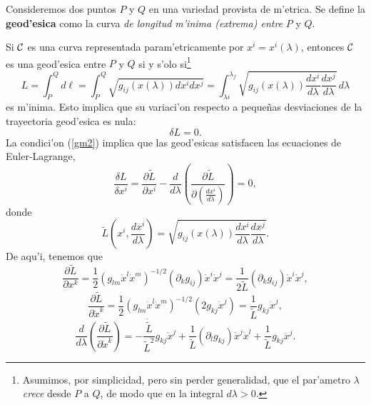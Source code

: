 Consideremos dos puntos $P$ y $Q$ en una variedad provista de m'etrica.
Se define la \textbf{geod'esica} como la curva \textit{de longitud m'inima  (extrema) entre} $P$ y $Q$.

Si $\cal C$ es una curva representada param'etricamente por
$x^i =x^i (\lambda)$, entonces $\cal C$ es una geod'esica entre $P$ y $Q$ si y
s'olo si\footnote{Asumimos, por simplicidad, pero sin perder generalidad, que el par'ametro $\lambda$ \textit{crece} desde $P$ a $Q$, de modo que en la integral $d\lambda>0$.}
\begin{equation}
L=\int_P^Qd\ell= \int_P^Q\sqrt{g_{ij}(x(\lambda))dx^idx^j}=\int_{\lambda i}^{\lambda_{f}}\sqrt{g_{ij}(x(\lambda))\frac{dx^i}{d\lambda}\frac{dx^j }{d\lambda}}\, d\lambda \label{gm1}
\end{equation}
es m'inima. Esto implica que su variaci'on respecto a peque\~nas desviaciones de la trayectoria geod'esica es nula:
\begin{equation}
\delta L=0. \label{gm2}
\end{equation}
La condici'on (\ref{gm2}) implica que las geod'esicas satisfacen las ecuaciones de Euler-Lagrange,
\begin{equation}
\frac{\delta L}{\delta x^i }=\frac{\partial \tilde{L}}{\partial x^i }-\frac
{d}{d\lambda}\left( \frac{\partial
\tilde{L}}{\partial\left(\frac{dx^i}{d\lambda}\right) }\right) =0,
\label{gm3}
\end{equation}
donde
\begin{equation}
\tilde{L}(x^i,\frac{dx^i}{d\lambda})=\sqrt{g_{ij}(x(\lambda))\frac{dx^i
}{d\lambda}\frac{dx^j }{d\lambda}}.
\label{gm4}
\end{equation}
De aqu'i, tenemos que
\begin{equation}
\frac{\partial\tilde{L}}{\partial x^k}=\frac{1}{2}(g_{lm}\dot{x}^l\dot{x}^m)^{-1/2}(\partial_k g_{ij})\dot{x}^i\dot{x}^j=\frac{1}{2\tilde{L}}(\partial_k g_{ij})\dot{x}^i\dot{x}^j,
\end{equation}
\begin{equation}
\frac{\partial\tilde{L}}{\partial \dot{x}^k}=\frac{1}{2}(g_{lm}\dot{x}^l\dot{x}^m)^{-1/2}(2g_{kj}\dot{x}^j)=\frac{1}{\tilde{L}}g_{kj}\dot{x}^j,
\end{equation}
\begin{equation}
\frac{d}{d\lambda}\left(\frac{\partial\tilde{L}}{\partial \dot{x}^k}\right)= -\frac{\dot{\tilde{L}}}{\tilde{L}^2}g_{kj}\dot{x}^j+\frac{1}{\tilde{L}}(\partial_l g_{kj})\dot{x}^j\dot{x}^l+\frac{1}{\tilde{L}}g_{kj}\ddot{x}^j.
\end{equation}
